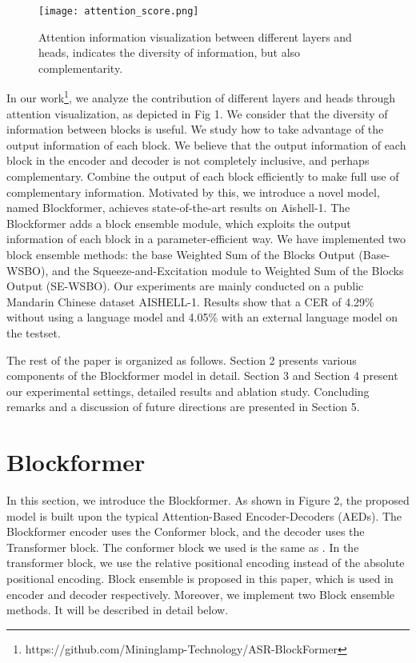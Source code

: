 \documentclass[a4paper]{article}
\begin{document}
\begin{figure}[t]
  \centering
  \texttt{[image: attention\_score.png]}
  \caption{Attention information visualization between different layers and heads, indicates the diversity of information, but also complementarity.}
  \label{fig:speech_production}
\end{figure}

In our work\footnote{https://github.com/Mininglamp-Technology/ASR-BlockFormer}, we analyze the contribution of different layers and heads through attention visualization, as depicted in Fig 1. We consider that the diversity of information between blocks is useful. We study how to take advantage of the output information of each block. We believe that the output information of each block in the encoder and decoder is not completely inclusive, and perhaps complementary. Combine the output of each block efficiently to make full use of complementary information. 
Motivated by this, we introduce a novel model, named Blockformer, achieves state-of-the-art results on Aishell-1. The Blockformer adds a block ensemble module, which exploits the output information of each block in a parameter-efficient way.  
We have implemented two block ensemble methods: the base Weighted Sum of the Blocks Output (Base-WSBO), and the Squeeze-and-Excitation module\cite{Hu2020SqueezeandExcitationN} to Weighted Sum of the Blocks Output (SE-WSBO).
Our experiments are mainly conducted on a public Mandarin Chinese dataset AISHELL-1. Results show that a CER of 4.29\% without using a language model and 4.05\% with an external language model on the testset. 



The rest of the paper is organized as follows. Section 2 presents
various components of the Blockformer model in detail. Section 3 and Section 4 present our experimental settings, detailed results and ablation study. Concluding remarks and a discussion of future directions are presented in Section 5.



\section{Blockformer}
In this section, we introduce the Blockformer. As shown in Figure 2, the proposed model is built upon the typical Attention-Based Encoder-Decoders (AEDs). The Blockformer encoder uses the Conformer block, and the decoder uses the Transformer block. The conformer block we used is the same as \cite{gulati2020conformer}. In the transformer block, we use the relative positional encoding instead of the absolute positional encoding. Block ensemble is proposed in this paper, which is used in encoder and decoder respectively. Moreover, we implement two Block ensemble methods. It will be described in detail below.
\end{document}
